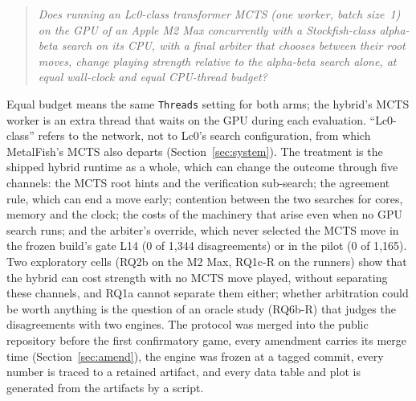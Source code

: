 \documentclass{article}
\newcommand{\MF}{MetalFish}
\begin{document}
\begin{quote}
\emph{Does running an Lc0-class transformer MCTS (one worker, batch size~1) on the GPU of an Apple M2 Max concurrently with a Stockfish-class alpha-beta search on its CPU, with a final arbiter that chooses between their root moves, change playing strength relative to the alpha-beta search alone, at equal wall-clock and equal CPU-thread budget?}
\end{quote}

Equal budget means the same \texttt{Threads} setting for both arms; the hybrid's MCTS worker is an extra thread that waits on the GPU during each evaluation. ``Lc0-class'' refers to the network, not to Lc0's search configuration, from which \MF{}'s MCTS also departs (Section~\ref{sec:system}). The treatment is the shipped hybrid runtime as a whole, which can change the outcome through five channels: the MCTS root hints and the verification sub-search; the agreement rule, which can end a move early; contention between the two searches for cores, memory and the clock; the costs of the machinery that arise even when no GPU search runs; and the arbiter's override, which never selected the MCTS move in the frozen build's gate L14 (0 of 1{,}344 disagreements) or in the pilot (0 of 1{,}165). Two exploratory cells (RQ2b on the M2 Max, RQ1c-R on the runners) show that the hybrid can cost strength with no MCTS move played, without separating these channels, and RQ1a cannot separate them either; whether arbitration could be worth anything is the question of an oracle study (RQ6b-R) that judges the disagreements with two engines. %
The protocol was merged into the public repository before the first confirmatory game, every amendment carries its merge time (Section~\ref{sec:amend}), the engine was frozen at a tagged commit, every number is traced to a retained artifact, and every data table and plot is generated from the artifacts by a script.
\end{document}
